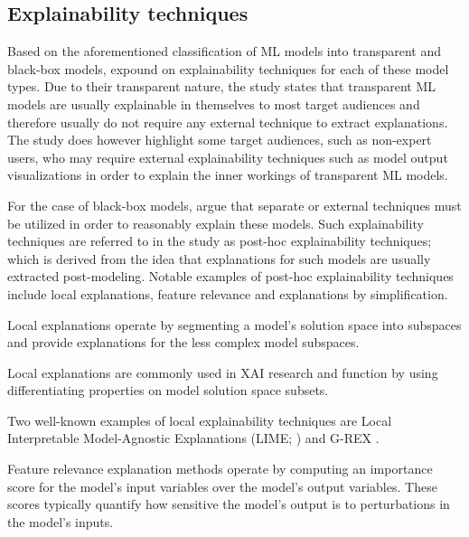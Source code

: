 \subsection{Explainability techniques}

\label{section:xai-techniques}

Based on the aforementioned classification of ML models into transparent and black-box models, \citet{arrieta2020explainable} expound on explainability techniques for each of these model types. Due to their transparent nature, the study states that transparent ML models are usually explainable in themselves to most target audiences and therefore usually do not require any external technique to extract explanations. The study does however highlight some target audiences, such as non-expert users, who may require external explainability techniques such as model output visualizations in order to explain the inner workings of transparent ML models.

For the case of black-box models, \citet{arrieta2020explainable} argue that separate or external techniques must be utilized in order to reasonably explain these models. Such explainability techniques are referred to in the study as post-hoc explainability techniques; which is derived from the idea that explanations for such models are usually extracted post-modeling. Notable examples of post-hoc explainability techniques include local explanations, feature relevance and explanations by simplification.

\begin{definition}
  Local explanations operate by segmenting a model's solution space into subspaces and provide explanations for the less complex model subspaces.
\end{definition}

\begin{remark}
  Local explanations are commonly used in XAI research and function by using differentiating properties on model solution space subsets.
\end{remark}

\begin{remark}
  Two well-known examples of local explainability techniques are Local Interpretable Model-Agnostic Explanations (LIME; \citealt{lime}) and G-REX \citep{konig2008g}.
\end{remark}

\begin{definition}
  Feature relevance explanation methods operate by computing an importance score for the model's input variables over the model's output variables. These scores typically quantify how sensitive the model's output is to perturbations in the model's inputs.
\end{definition}

